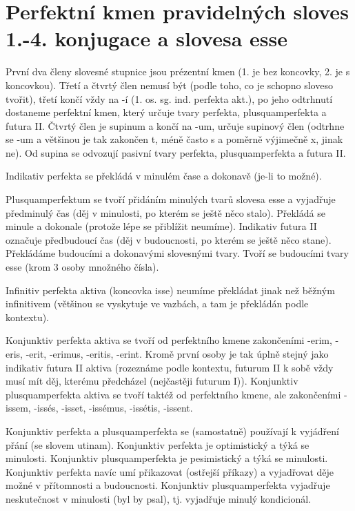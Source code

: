 \documentclass[12pt]{article}					%
\begin{document}
\section{Perfektní kmen pravidelných sloves 1.-4. konjugace a slovesa esse}
První dva členy slovesné stupnice jsou prézentní kmen (1. je bez koncovky, 2. je s koncovkou). Třetí a čtvrtý člen nemusí být (podle toho, co je schopno sloveso tvořit), třetí končí vždy na -í (1. os. sg. ind. perfekta akt.), po jeho odtrhnutí dostaneme perfektní kmen, který určuje tvary perfekta, plusquamperfekta a futura II. Čtvrtý člen je supinum a končí na -um, určuje supinový člen (odtrhne se -um a většinou je tak zakončen t, méně často s a poměrně výjimečně x, jinak ne). Od supina se odvozují pasivní tvary perfekta, plusquamperfekta a futura II.

Indikativ perfekta se překládá v minulém čase a dokonavě (je-li to možné).


Plusquamperfektum se tvoří přidáním minulých tvarů slovesa esse a vyjadřuje předminulý čas (děj v minulosti, po kterém se ještě něco stalo). Překládá se minule a dokonale (protože lépe se přiblížit neumíme). Indikativ futura II označuje předbudoucí čas (děj v budoucnosti, po kterém se ještě něco stane). Překládáme budoucími a dokonavými slovesnými tvary. Tvoří se budoucími tvary esse (krom 3 osoby množného čísla).

Infinitiv perfekta aktiva (koncovka isse) neumíme překládat jinak než běžným infinitivem (většinou se vyskytuje ve vazbách, a tam je překládán podle kontextu).


Konjunktiv perfekta aktiva se tvoří od perfektního kmene zakončeními -erim, -eris, -erit, -erimus, -eritis, -erint. Kromě první osoby je tak úplně stejný jako indikativ futura II aktiva (rozeznáme podle kontextu, futurum II k sobě vždy musí mít děj, kterému předcházel (nejčastěji futurum I)). Konjunktiv plusquamperfekta aktiva se tvoří taktéž od perfektního kmene, ale zakončeními -issem, -issés, -isset, -issémus, -issétis, -issent.

Konjunktiv perfekta a plusquamperfekta se (samostatně) používají k vyjádření přání (se slovem utinam). Konjunktiv perfekta je optimistický a týká se minulosti. Konjunktiv plusquamperfekta je pesimistický a týká se minulosti. Konjunktiv perfekta navíc umí přikazovat (ostřejší příkazy) a vyjadřovat děje možné v přítomnosti a budoucnosti. Konjunktiv plusquamperfekta vyjadřuje neskutečnost v minulosti (byl by psal), tj. vyjadřuje minulý kondicionál.
\end{document}
